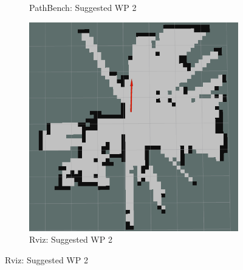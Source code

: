 \begin{figure}[h!]
\begin{subfigure}[b]{0.32\linewidth}
     \caption{PathBench: Suggested WP 2}
  \end{subfigure}
  \hfill
  \begin{subfigure}[b]{0.32\linewidth}
    \includegraphics[width=\linewidth]{images/real/sys/3_3.png}
     \caption{Rviz: Suggested WP 2}
  \end{subfigure}
\end{figure}

